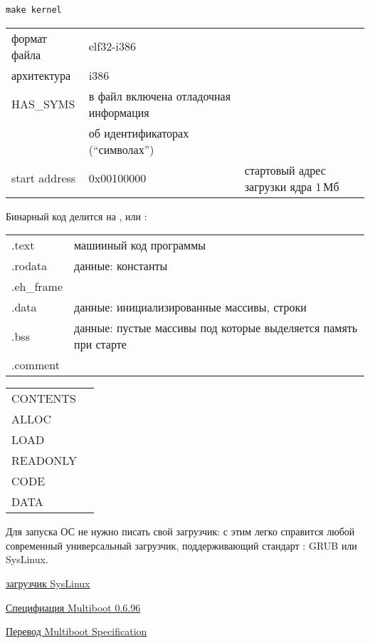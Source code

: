 \begin{verbatim}
make kernel
\end{verbatim}

\begin{tabular}{l l l}
формат файла & elf32-i386 \\
архитектура & i386 \\
HAS\_SYMS & в файл включена отладочная информация \\& об идентификаторах
(``символах'')\\
start address & 0x00100000 & стартовый адрес загрузки ядра 1\,Мб\\
\end{tabular}

\bigskip
Бинарный код делится на , или
:

\begin{tabular}{l l}
.text & машииный код программы \\
.rodata & данные: константы \\
.eh\_frame &\\
.data & данные: инициализированные массивы, строки \\
.bss & данные: пустые массивы под которые выделяется память при старте \\
.comment &\\
\end{tabular}

\bigskip
\begin{tabular}{l l}
CONTENTS & \\
ALLOC & \\
LOAD & \\
READONLY & \\
CODE & \\
DATA & \\
\end{tabular}



Для запуска ОС не нужно писать свой загрузчик: с этим легко справится любой
современный универсальный загрузчик, поддерживающий стандарт
: GRUB или SysLinux.

\bigskip
\href{http://www.syslinux.org/}{загрузчик SysLinux}

\href{http://www.gnu.org/software/grub/manual/multiboot/multiboot.html}{Специфиация
Multiboot 0.6.96}

\href{http://gownos.blogspot.ru/2011/10/multiboot-specification.html}{Перевод
Multiboot Specification}
\bigskip

